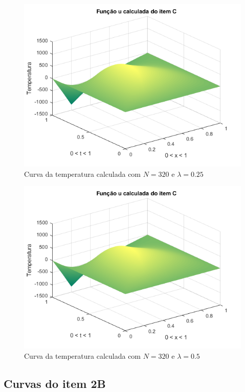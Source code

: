 \documentclass[12pt]{article}
\begin{document}
\begin{spacing}{1.5}
\begin{figure}
    \centering
    \includegraphics[width=0.8\linewidth]{Primeira_Tarefa/ItemC/n320_lambda0-25_calc.png}
    \caption{Curva da temperatura calculada com $N=320$ e $\lambda=0.25$}
    \label{fig:C_n320lambda0-25_exata}
\end{figure}
\begin{figure}
    \centering
    \includegraphics[width=0.8\linewidth]{Primeira_Tarefa/ItemC/n320_lambda0-5_calc.png}
    \caption{Curva da temperatura calculada com $N=320$ e $\lambda=0.5$}
    \label{fig:C_n320lambda0-5_calc}
\end{figure}


\clearpage
\subsection{Curvas do item 2B} \label{curvas2B}


\end{spacing}
\end{document}
